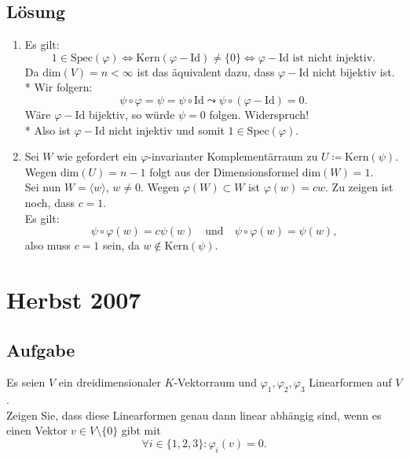 \subsection{Lösung}
\begin{enumerate}
	\item Es gilt:
	\begin{equation*}
	 	1 \in \text{Spec}(\varphi) \Leftrightarrow \text{Kern}(\varphi - \text{Id}) \neq \{  0 \} \Leftrightarrow \varphi - \text{Id ist nicht injektiv.}
	 \end{equation*} 
	 Da \( \text{dim}(V) = n < \infty \) ist das äquivalent dazu, dass \( \varphi - \text{Id} \) nicht bijektiv ist.
	 \\*
	 Wir folgern:
	 \begin{equation*}
	 	\psi \circ \varphi = \psi = \psi \circ \text{Id} \leadsto \psi \circ (\varphi - \text{Id}) = 0\text{.}
	 \end{equation*}
	 Wäre \( \varphi - \text{Id} \) bijektiv, so würde \( \psi = 0 \) folgen. Widerspruch! \\*
	 Also ist \( \varphi - \text{Id} \) nicht injektiv und somit \( 1 \in \text{Spec}(\varphi) \).

	 \item Sei \( W \) wie gefordert ein \( \varphi \)-invarianter Komplementärraum zu \( U \coloneqq \text{Kern}(\psi) \). Wegen \( \text{dim}(U) = n - 1 \) folgt aus der Dimensionsformel \( \text{dim}(W) = 1 \). 
	 \\
	 Sei nun \( W = \langle w \rangle \), \( w \neq 0 \). Wegen \( \varphi(W) \subset W \) ist \( \varphi(w) = cw \). Zu zeigen ist noch, dass \( c = 1 \).
	 \\
	 Es gilt:
	 \begin{equation*}
	 	\psi \circ \varphi(w) = c\psi(w) \quad \text{und} \quad \psi \circ \varphi(w) = \psi(w)\text{,}
	 \end{equation*}
	 also muss \( c = 1 \) sein, da \( w \not \in \text{Kern}(\psi) \).
\end{enumerate}

\newpage


\section{Herbst 2007}

\subsection{Aufgabe}
Es seien \( V \) ein dreidimensionaler \( K \)-Vektorraum und \( \varphi_1, \varphi_2, \varphi_3 \) Linearformen auf \( V \). \\
Zeigen Sie, dass diese Linearformen genau dann linear abhängig sind, wenn es einen Vektor \( v \in V \setminus \{ 0 \} \) gibt mit
\begin{equation*}
	\forall i \in \{1, 2, 3 \}: \varphi_i(v) = 0\text{.}
\end{equation*}


